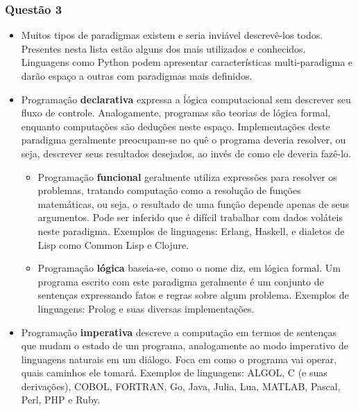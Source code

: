 \documentclass{../sftex/sftex}
\begin{document}
\subsubsection*{Questão 3}
\begin{itemize}
    \item Muitos tipos de paradigmas existem e seria inviável descrevê-los
    todos. Presentes nesta lista estão alguns dos mais utilizados e conhecidos.
    Linguagens como Python podem apresentar características multi-paradigma e
    darão espaço a outras com paradigmas mais definidos.

    \item Programação \textbf{declarativa} expressa a ĺógica computacional sem
    descrever seu fluxo de controle. Analogamente, programas são teorias de
    lógica formal, enquanto computações são deduções neste espaço.
    Implementações deste paradigma geralmente preocupam-se no quê o programa
    deveria resolver, ou seja, descrever seus resultados desejados, ao invés de
    como ele deveria fazê-lo.

    \begin{itemize}
        \item Programação \textbf{funcional} geralmente utiliza expressões para
        resolver os problemas, tratando computação como a resolução de funções
        matemáticas, ou seja, o resultado de uma função depende apenas de seus
        argumentos. Pode ser inferido que é difícil trabalhar com dados voláteis
        neste paradigma. Exemplos de linguagens: Erlang, Haskell, e dialetos de
        Lisp como Common Lisp e Clojure.

        \item Programação \textbf{lógica} baseia-se, como o nome diz, em lógica
        formal. Um programa escrito com este paradigma geralmente é um conjunto
        de sentenças expressando fatos e regras sobre algum problema. Exemplos
        de linguagens: Prolog e suas diversas implementações.
    \end{itemize}

    \item Programação \textbf{imperativa} descreve a computação em termos de
    sentenças que mudam o estado de um programa, analogamente ao modo imperativo
    de linguagens naturais em um diálogo. Foca em como o programa vai operar,
    quais caminhos ele tomará. Exemplos de linguagens: ALGOL, C (e suas
    derivações), COBOL, FORTRAN, Go, Java, Julia, Lua, MATLAB, Pascal, Perl,
    PHP e Ruby.


\end{itemize}
\end{document}
